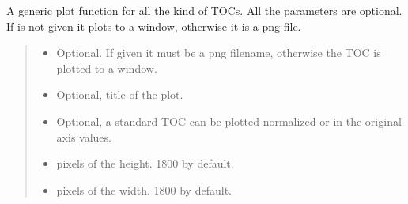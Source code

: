 \documentclass[letterpaper,10pt,english]{sphinxmanual}
\begin{document}
\begin{fulllineitems}
\label{\detokenize{usage:ootoc.TOC.plot}}
\pysigstartsignatures
{}
\pysigstopsignatures
\sphinxAtStartPar
A generic plot function for all the kind of TOCs.  All the parameters are optional. If  is not given it plots to a window, otherwise it is a png file.
\begin{quote}\begin{description}
\begin{itemize}
\item {} 
\sphinxAtStartPar
{} \textendash{} Optional. If given it must be a png filename, otherwise the TOC is plotted to a window.

\item {} 
\sphinxAtStartPar
{} \textendash{} Optional, title of the plot.

\item {} 
\sphinxAtStartPar
{} \textendash{} Optional, a standard TOC can be plotted normalized or in the original axis values.

\item {} 
\sphinxAtStartPar
{} \textendash{} pixels of the height. 1800 by default.

\item {} 
\sphinxAtStartPar
{} \textendash{} pixels of the width. 1800 by default.


\end{itemize}
\end{description}
\end{quote}
\end{fulllineitems}
\end{document}
